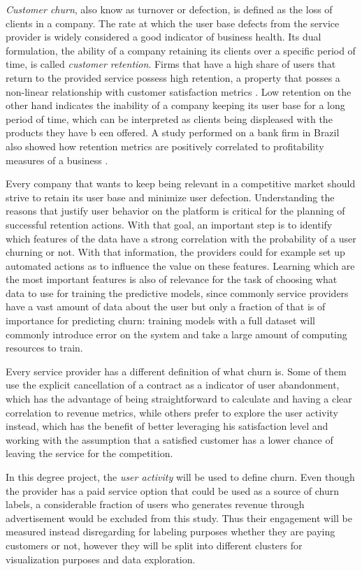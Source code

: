 \documentclass{kththesis}
\begin{document}
\emph{Customer churn}, also know as turnover or defection, is defined as the loss of clients in a company. The rate at which the user base defects from the service provider is widely considered a good indicator of business health. Its dual formulation, the ability of a company retaining its clients over a specific period of time, is called \emph{customer retention}. Firms that have a high share of users that return to the provided service possess high retention, a property that posses a non-linear relationship with customer satisfaction metrics \citep{hennig1997impact}. Low retention on the other hand indicates the inability of a company keeping its user base for a long period of time, which can be interpreted as clients being displeased with the products they have b	een offered. A study performed on a bank firm in Brazil also showed how retention metrics are positively correlated to profitability measures of a business \citep{morgan2006value}. 
        
Every company that wants to keep being relevant in a competitive market should strive to retain its user base and minimize user defection. Understanding the reasons that justify user behavior on the platform is critical for the planning of successful retention actions. With that goal, an important step is to identify which features of the data have a strong correlation with the probability of a user churning or not. With that information, the providers could for example set up automated actions as to influence the value on these features. Learning which are the most important features is also of relevance for the task of choosing what data to use for training the predictive models, since commonly service providers have a vast amount of data about the user but only a fraction of that is of importance for predicting churn: training models with a full dataset will commonly introduce error on the system and take a large amount of computing resources to train.

Every service provider has a different definition of what churn is. Some of them use the explicit cancellation of a contract as a indicator of user abandonment, which has  the advantage of being straightforward to calculate and having a clear correlation to revenue metrics, while others prefer to explore the user activity instead, which has the benefit of better leveraging his satisfaction level and working with the assumption that a satisfied customer has a lower chance of leaving the service for the competition. 

In this degree project, the \emph{user activity} will be used to define churn. Even though the provider has a paid service option that could be used as a source of churn labels, a considerable fraction of users who generates revenue through advertisement would be excluded from this study. Thus their engagement will be measured instead disregarding for labeling purposes whether they are paying customers or not, however they will be split into different clusters for visualization purposes and data exploration.
\end{document}
